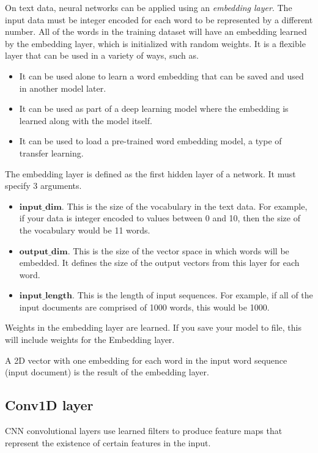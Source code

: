 On text data, neural networks can be applied using an \emph{embedding layer}. The input data must be integer encoded for each word to be represented by a different number. All of the words in the training dataset will have an embedding learned by the embedding layer, which is initialized with random weights. It is a flexible layer that can be used in a variety of ways, such as.
\begin{itemize}
	\item It can be used alone to learn a word embedding that can be saved and used in another model later.
	\item It can be used as part of a deep learning model where the embedding is learned along with the model itself.
	\item It can be used to load a pre-trained word embedding model, a type of transfer learning.
\end{itemize}
\hspace{0.5cm}The embedding layer is defined as the first hidden layer of a network. It must specify 3 arguments.
\begin{itemize}
	\item $\textbf{input\_dim.}$ This is the size of the vocabulary in the text data. For example, if your data is integer encoded to values between 0 and 10, then the size of the vocabulary would be 11 words.
	\item $\textbf{output\_dim.}$ This is the size of the vector space in which words will be embedded. It defines the size of the output vectors from this layer for each word.
	\item $\textbf{input\_length.}$ This is the length of input sequences. For example, if all of the input documents are comprised of 1000 words, this would be 1000.
\end{itemize}
\hspace{0.5cm}Weights in the embedding layer are learned. If you save your model to file, this will include weights for the Embedding layer.

A 2D vector with one embedding for each word in the input word sequence (input document) is the result of the embedding layer.

\subsection{Conv1D layer}
\hspace{0.5cm}CNN convolutional layers use learned filters to produce feature maps that represent the existence of certain features in the input.

